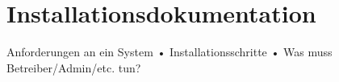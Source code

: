 
\chapter{Installationsdokumentation}

Anforderungen an ein System
• Installationsschritte
• Was muss Betreiber/Admin/etc. tun?

\newpage



\newpage



\newpage